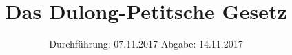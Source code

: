 

\subject{V201}
\title{\texorpdfstring{Das Dulong-Petitsche Gesetz}{}}
\date{
	Durchführung: 07.11.2017
	\hspace{4em}
	Abgabe: 14.11.2017
}


	\maketitle
	\newpage
	\tableofcontents
	\newpage
	
	
	
	
	
	
	\newpage

	\printbibliography
